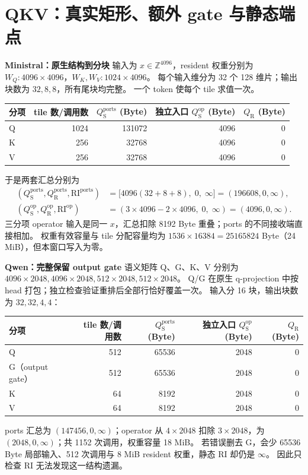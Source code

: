 \documentclass[11pt,a4paper,fontset=fandol]{ctexart}
\newcommand{\qs}{Q_{\mathrm S}}
\newcommand{\qr}{Q_{\mathrm R}}
\newcommand{\RI}{\mathrm{RI}}
\newcommand{\op}{\mathrm{op}}
\newcommand{\loc}{\mathrm{ports}}
\newcommand{\para}[1]{\par\smallskip\noindent\textbf{#1}\quad}
\begin{document}
\section{QKV：真实矩形、额外 gate 与静态端点}
\para{Ministral：原生结构到分块}
输入为 $x\in\mathbb Z^{4096}$，resident 权重分别为
$W_Q:4096\times4096$，$W_K,W_V:1024\times4096$。
每个输入维分为 32 个 128 维片；输出块数为 $32,8,8$，所有尾块均完整。
一个 token 使每个 tile 求值一次。
\begin{center}\small
\begin{tabular}{@{}lrrrr@{}}\toprule
分项 & tile 数/调用数 & $\qs^{\loc}$ (Byte) & 独立入口 $\qs^{\op}$ (Byte) & $\qr$ (Byte)\\\midrule
Q & 1024 & 131072 & 4096 & 0\\
K & 256 & 32768 & 4096 & 0\\
V & 256 & 32768 & 4096 & 0\\\bottomrule
\end{tabular}\end{center}
于是两套汇总分别为
\begin{align*}
(\qs^{\loc},\qr^{\loc},\RI^{\loc})
 &=\bigl[4096(32+8+8),\;0,\;\infty\bigr]
 =(196608,0,\infty),\\
(\qs^{\op},\qr^{\op},\RI^{\op})
 &=(3\times4096-2\times4096,\;0,\;\infty)=(4096,0,\infty).
\end{align*}
三分项 operator 输入是同一 $x$，汇总扣除 8192 Byte 重叠；ports 的不同接收端直接相加。
权重有效容量与 tile 分配容量均为 $1536\times16384=25165824$ Byte（24 MiB），但本窗口写入为零。

\para{Qwen：完整保留 output gate}
语义矩阵 Q、G、K、V 分别为
$4096\times2048,4096\times2048,512\times2048,512\times2048$。
Q/G 在原生 q-projection 中按 head 打包；独立检查验证重排后全部行恰好覆盖一次。
输入分 16 块，输出块数为 $32,32,4,4$：
\begin{center}\small
\begin{tabular}{@{}lrrrr@{}}\toprule
分项 & tile 数/调用数 & $\qs^{\loc}$ (Byte) & 独立入口 $\qs^{\op}$ (Byte) & $\qr$ (Byte)\\\midrule
Q & 512 & 65536 & 2048 & 0\\
G（output gate） & 512 & 65536 & 2048 & 0\\
K & 64 & 8192 & 2048 & 0\\
V & 64 & 8192 & 2048 & 0\\\bottomrule
\end{tabular}\end{center}
ports 汇总为 $(147456,0,\infty)$；operator 从 $4\times2048$ 扣除
$3\times2048$，为 $(2048,0,\infty)$；共 1152 次调用，权重容量 18 MiB。
若错误删去 G，会少 65536 Byte 局部输入、512 次调用与 8 MiB resident 权重，静态 RI 却仍是 $\infty$。
因此只检查 RI 无法发现这一结构遗漏。
\end{document}
